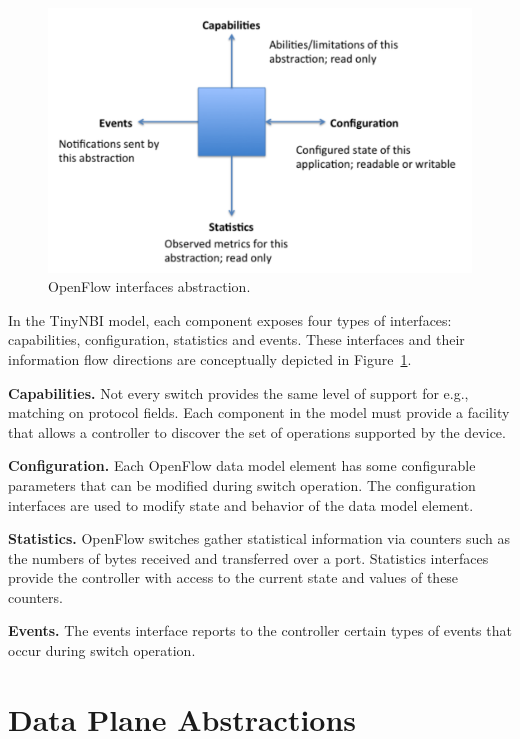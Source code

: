 \begin{figure}[t]
  \centering
  \includegraphics[scale=0.64]{figures/abstraction.pdf}
  \caption{OpenFlow interfaces abstraction.}
  \label{fig:abstraction}
\end{figure}

In the TinyNBI model, each component exposes four types of interfaces:
capabilities, configuration, statistics and events.  These interfaces and their
information flow directions are conceptually depicted in
Figure~\ref{fig:abstraction}.

\textbf{Capabilities.} Not every switch provides the same level of
support for e.g., matching on protocol fields. Each component in the
model must provide a facility that allows a controller to discover the
set of operations supported by the device.

\textbf{Configuration.} Each OpenFlow data model element has some
configurable parameters that can be modified during switch operation.
The configuration interfaces are used to modify state and behavior of the data
model element. 

\textbf{Statistics.}  OpenFlow switches gather statistical information
via counters such as the numbers of bytes received and transferred over a
port. Statistics interfaces provide the controller with access to the current
state and values of these counters. 

\textbf{Events.} The events interface reports to the controller certain
types of events that occur during switch operation. 


\section{\aetherflow Data Plane Abstractions}


